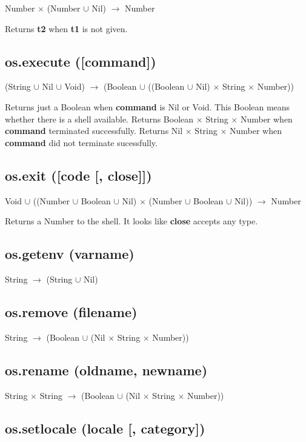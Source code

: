 \documentclass[12pt]{article}
\begin{document}
Number $\times$ (Number $\cup$ Nil) $\rightarrow$
Number

Returns \textbf{t2} when \textbf{t1} is not given.

\subsection{os.execute ([command])}

(String $\cup$ Nil $\cup$ Void) $\rightarrow$
(Boolean $\cup$ ((Boolean $\cup$ Nil) $\times$ String $\times$ Number))

Returns just a Boolean when \textbf{command} is Nil or Void.
This Boolean means whether there is a shell available.
Returns Boolean $\times$ String $\times$ Number when \textbf{command}
terminated successfully.
Returns Nil $\times$ String $\times$ Number when \textbf{command}
did not terminate sucessfully.

\subsection{os.exit ([code [, close]])}

Void $\cup$
((Number $\cup$ Boolean $\cup$ Nil) $\times$
(Number $\cup$ Boolean $\cup$ Nil)) $\rightarrow$
Number

Returns a Number to the shell.
It looks like \textbf{close} accepts any type.

\subsection{os.getenv (varname)}

String $\rightarrow$ (String $\cup$ Nil)

\subsection{os.remove (filename)}

String $\rightarrow$
(Boolean $\cup$ (Nil $\times$ String $\times$ Number))

\subsection{os.rename (oldname, newname)}

String $\times$ String $\rightarrow$
(Boolean $\cup$ (Nil $\times$ String $\times$ Number))

\subsection{os.setlocale (locale [, category])}
\end{document}
